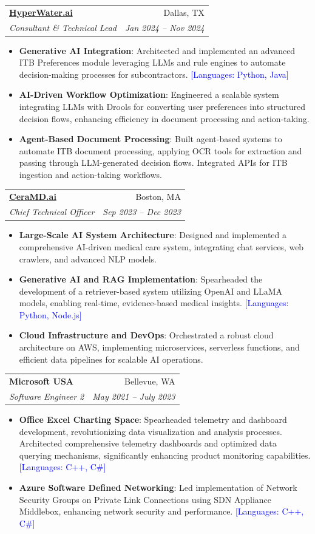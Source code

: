 \documentclass[letterpaper,11pt]{article}
\makeatletter
\newcommand{\resumeItem}[2]{
  \item\small{
    \textbf{#1}{: #2 \vspace{-2pt}}
  }
}
\newcommand{\resumeSubheading}[4]{
  \vspace{-1pt}\item
    \begin{tabular*}{0.97\textwidth}{l@{\extracolsep{\fill}}r}
      \textbf{#1} & #2 \\
      \textit{\small#3} & \textit{\small #4} \\
    \end{tabular*}\vspace{-5pt}
}
\newcommand{\resumeItemListStart}{\begin{itemize}}
\newcommand{\resumeItemListEnd}{\end{itemize}\vspace{-5pt}}
\makeatother
\begin{document}
    \resumeSubheading
      {\href{https://www.hyperwater.com/}{HyperWater.ai}}{Dallas, TX}
      {Consultant \& Technical Lead}{Jan 2024 -- Nov 2024}
      \resumeItemListStart
        \resumeItem{Generative AI Integration}
          {Architected and implemented an advanced ITB Preferences module leveraging LLMs and rule engines to automate decision-making processes for subcontractors. \textcolor{blue}{[Languages: Python, Java]}}
        \resumeItem{AI-Driven Workflow Optimization}
          {Engineered a scalable system integrating LLMs with Drools for converting user preferences into structured decision flows, enhancing efficiency in document processing and action-taking.}
        \resumeItem{Agent-Based Document Processing}
          {Built agent-based systems to automate ITB document processing, applying OCR tools for extraction and passing through LLM-generated decision flows. Integrated APIs for ITB ingestion and action-taking workflows.}
      \resumeItemListEnd

    \resumeSubheading
      {\href{https://www.ceramd.ai/}{CeraMD.ai}}{Boston, MA}
      {Chief Technical Officer}{Sep 2023 -- Dec 2023}
      \resumeItemListStart
        \resumeItem{Large-Scale AI System Architecture}
          {Designed and implemented a comprehensive AI-driven medical care system, integrating chat services, web crawlers, and advanced NLP models.}
        \resumeItem{Generative AI and RAG Implementation}
          {Spearheaded the development of a retriever-based system utilizing OpenAI and LLaMA models, enabling real-time, evidence-based medical insights. \textcolor{blue}{[Languages: Python, Node.js]}}
        \resumeItem{Cloud Infrastructure and DevOps}
          {Orchestrated a robust cloud architecture on AWS, implementing microservices, serverless functions, and efficient data pipelines for scalable AI operations.}
      \resumeItemListEnd

    \resumeSubheading
      {Microsoft USA}{Bellevue, WA}
      {Software Engineer 2}{May 2021 -- July 2023}
      \resumeItemListStart
        \resumeItem{Office Excel Charting Space}
          {Spearheaded telemetry and dashboard development, revolutionizing data visualization and analysis processes. Architected comprehensive telemetry dashboards and optimized data querying mechanisms, significantly enhancing product monitoring capabilities. \textcolor{blue}{[Languages: C++, C\#]}}
        \resumeItem{Azure Software Defined Networking}
          {Led implementation of Network Security Groups on Private Link Connections using SDN Appliance Middlebox, enhancing network security and performance. \textcolor{blue}{[Languages: C++, C\#]}}
      \resumeItemListEnd
\end{document}
